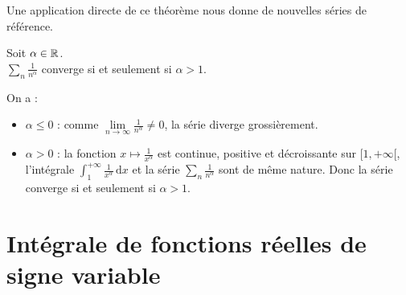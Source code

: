 \documentclass{book}
\begin{document}
Une application directe de ce théorème nous donne de nouvelles séries de référence.
\begin{Theoreme}
Soit $\alpha \in \mathbb{R}$.\\
$\sum_n \frac{1}{n^\alpha}$ converge si et seulement si $\alpha > 1$.
\end{Theoreme}
\begin{Demonstration}
On a :\\
\begin{itemize}
\item $\alpha\leq 0$ : comme  $\lim\limits_{n\to\infty} \frac{1}{n^\alpha}\neq 0$, la série diverge grossièrement.
\item $\alpha>0$ : la fonction $x\mapsto \frac{1}{x^\alpha}$ est continue, positive et décroissante sur $[1,+\infty[$, l'intégrale  $\int_1^{+\infty}\frac{1}{x^\alpha}  \,\mathrm dx$
et la série $\sum_n \frac{1}{n^\alpha}$ sont de même nature. Donc la série converge si et seulement si   $\alpha > 1$.
\end{itemize}
\end{Demonstration}
\section{Intégrale de fonctions réelles de signe variable}
\end{document}
